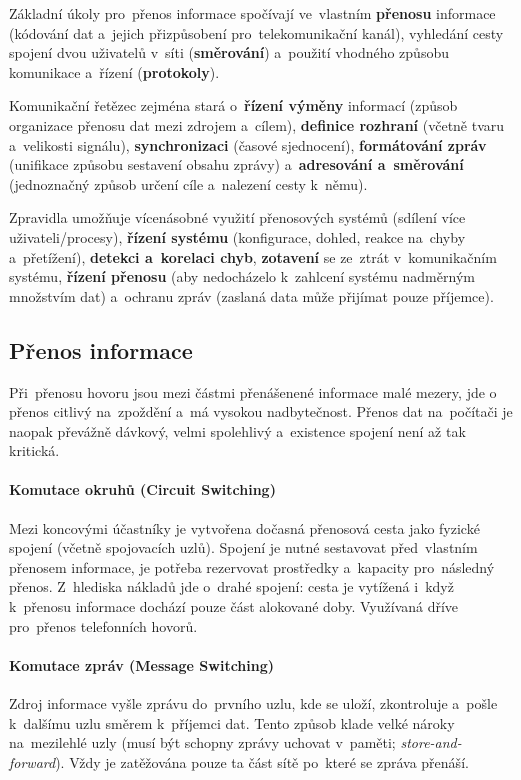 Základní úkoly pro~přenos informace spočívají ve~vlastním \textbf{přenosu} informace (kódování dat a~jejich přizpůsobení pro~telekomunikační kanál), vyhledání cesty spojení dvou uživatelů v~síti (\textbf{směrování}) a~použití vhodného způsobu komunikace a~řízení (\textbf{protokoly}).

Komunikační řetězec zejména stará o~\textbf{řízení výměny} informací (způsob organizace přenosu dat mezi zdrojem a~cílem), \textbf{definice rozhraní} (včetně tvaru a~velikosti signálu), \textbf{synchronizaci} (časové sjednocení), \textbf{formátování zpráv} (unifikace způsobu sestavení obsahu zprávy) a~\textbf{adresování a~směrování} (jednoznačný způsob určení cíle a~nalezení cesty k~němu).

Zpravidla umožňuje vícenásobné využití přenosových systémů (sdílení více uživateli/procesy), \textbf{řízení systému} (konfigurace, dohled, reakce na~chyby a~přetížení), \textbf{detekci a~korelaci chyb}, \textbf{zotavení} se ze~ztrát v~komunikačním systému, \textbf{řízení přenosu} (aby nedocházelo k~zahlcení systému nadměrným množstvím dat) a~ochranu zpráv (zaslaná data může přijímat pouze příjemce).

\subsection{Přenos informace}

Při~přenosu hovoru jsou mezi částmi přenášenené informace malé mezery, jde o přenos citlivý na~zpoždění a~má vysokou nadbytečnost. Přenos dat na~počítači je naopak převážně dávkový, velmi spolehlivý a~existence spojení není až tak kritická.

\paragraph{Komutace okruhů (Circuit Switching)} Mezi koncovými účastníky je vytvořena dočasná přenosová cesta jako fyzické spojení (včetně spojovacích uzlů). Spojení je nutné sestavovat před~vlastním přenosem informace, je potřeba rezervovat prostředky a~kapacity pro~následný přenos. Z~hlediska nákladů jde o~drahé spojení: cesta je vytížená i~když k~přenosu informace dochází pouze část alokované doby. Využívaná dříve pro~přenos telefonních hovorů.

\paragraph{Komutace zpráv (Message Switching)} Zdroj informace vyšle zprávu do~prvního uzlu, kde se uloží, zkontroluje a~pošle k~dalšímu uzlu směrem k~příjemci dat. Tento způsob klade velké nároky na~mezilehlé uzly (musí být schopny zprávy uchovat v~paměti; \emph{store-and-forward}). Vždy je zatěžována pouze ta část sítě po~které se zpráva přenáší.

